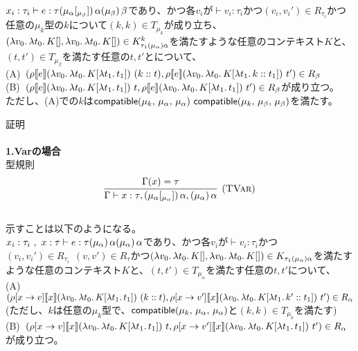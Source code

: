 \setcounter{definition}{7}
\begin{theorem}
  $x_i:\tau_i \vdash e:\tau (\mu_{\alpha}\lbrack \tiny{_{\mu_{\beta}}} \rbrack)\,\alpha (\mu_{\beta})\,\beta$であり、かつ各$v_i$が$\vdash v_i:\tau_i$かつ$(v_i,v_i') \in R_{\tau_i}$かつ任意の$\mu_k$型の$k$について$(k,k)\in T_{\mu_k}$が成り立ち、$(\lambda{v_0}.\,{\lambda{t_0}.\,{K[]}}, \lambda{v_0}.\,{\lambda{t_0}.\,{K[]}})\in  K^k_{\tau_1(\mu_{\alpha})\alpha}$を満たすような任意のコンテキスト$K$と、$(t, t') \in T_{\mu_{\beta}}$を満たす任意の$t, t'$とについて、\\
  (A)\ $(\rho [\![{e}]\!] (\lambda{v_0}.\,{\lambda{t_0}.\,{K[\lambda{t_1}.\,{t_1}]}})\ (k::t), \rho [\![{e}]\!] (\lambda{v_0}.\,{\lambda{t_0}.\,{K[\lambda{t_1}.\,{k::t_1}]}})\ t')\in R_{\beta}$\\
  (B)\ $(\rho [\![{e}]\!] (\lambda{v_0}.\,{\lambda{t_0}.\,{K[\lambda{t_1}.\,{t_1}]}})\ t, \rho [\![{e}]\!] (\lambda{v_0}.\,{\lambda{t_0}.\,{K[\lambda{t_1}.\,{t_1}]}})\ t')\in R_{\beta}$が成り立つ。\\
  ただし、(A)での$k$は$\Compatible{\mu_k}{\mu_{\alpha}}{\mu_{\alpha}}\ \Compatible{\mu_k}{\mu_{\beta}}{\mu_{\beta}}$を満たす。\\
\end{theorem}
\lbrack 証明 \rbrack\\\\
\textbf{1.Varの場合}\\
型規則
\[
\begin{array}{c}
\infer[\TVar]
      {\JudgeTrail{\Gamma}{x}{\tau}{\TrailsType{\alpha}{\alpha}}
                                   {\TrailType{\alpha}}}
      {\Gamma(x)=\tau}
\end{array}
\]
\\
示すことは以下のようになる。\\
$x_i:\tau_i\ ,\ x:\tau\vdash e:\tau (\mu_{\alpha})\,\alpha (\mu_{\alpha})\,\alpha$であり、かつ各$v_i$が$\vdash v_i:\tau_i$かつ$(v_i,v_i') \in R_{\tau_i}\ \ (v,v')\in R_{\tau}$かつ$(\lambda{v_0}.\,{\lambda{t_0}.\,{K[]}}, \lambda{v_0}.\,{\lambda{t_0}.\,{K[]}})\in  K_{\tau_1(\mu_{\alpha})\alpha}$を満たすような任意のコンテキスト$K$と、$(t, t') \in T_{\mu_{\alpha}}$を満たす任意の$t, t'$について、\\
(A)\ $(\rho[x \rightarrow v] [\![{x}]\!] (\lambda{v_0}.\,{\lambda{t_0}.\,{K[\lambda{t_1}.\,{t_1}]}})\ (k::t), \rho[x \rightarrow v'] [\![{x}]\!] (\lambda{v_0}.\,{\lambda{t_0}.\,{K[\lambda{t_1}.\,{k'::t_1}]}})\ t')\in R_{\alpha}$\\
(ただし、$k$は任意の$\mu_k$型で、$\textsf{compatible}(\mu_k,\,\mu_{\alpha},\,\mu_{\alpha})$と$(k,k)\in T_{\mu_k}$を満たす)\\
  (B)\ $(\rho[x \rightarrow v] [\![{x}]\!] (\lambda{v_0}.\,{\lambda{t_0}.\,{K[\lambda{t_1}.\,{t_1}]}})\ t, \rho[x \rightarrow v'] [\![{x}]\!] (\lambda{v_0}.\,{\lambda{t_0}.\,{K[\lambda{t_1}.\,{t_1}]}})\ t')\in R_{\alpha}$が成り立つ。\\
